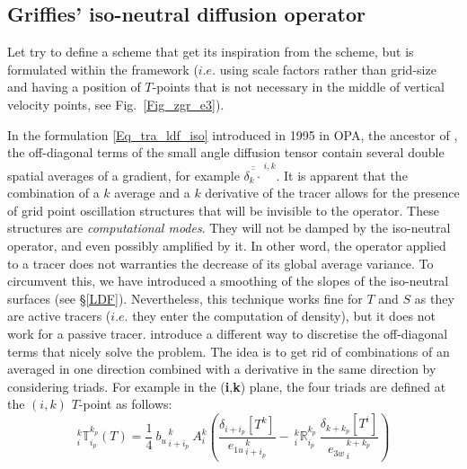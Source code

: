 \documentclass[NEMO_book]{subfiles}
\begin{document}
\subsection{Griffies' iso-neutral diffusion operator}

Let try to define a scheme that get its inspiration from the \citet{Griffies_al_JPO98}
scheme, but is formulated within the \NEMO framework ($i.e.$ using scale 
factors rather than grid-size and having a position of $T$-points that is not 
necessary in the middle of vertical velocity points, see Fig.~\ref{Fig_zgr_e3}).

In the formulation \eqref{Eq_tra_ldf_iso} introduced in 1995 in OPA, the ancestor of \NEMO, 
the off-diagonal terms of the small angle diffusion tensor contain several double 
spatial averages of a gradient, for example $\overline{\overline{\delta_k \cdot}}^{\,i,k}$. 
It is apparent that the combination of a $k$ average and a $k$ derivative of the tracer 
allows for the presence of grid point oscillation structures that will be invisible 
to the operator. These structures are \textit{computational modes}. They
will not be damped by the iso-neutral operator, and even possibly amplified by it. 
In other word, the operator applied to a tracer does not warranties the decrease of 
its global average variance. To circumvent this, we have introduced a smoothing of 
the slopes of the iso-neutral surfaces (see \S\ref{LDF}). Nevertheless, this technique 
works fine for $T$ and $S$ as they are active tracers ($i.e.$ they enter the computation 
of density), but it does not work for a passive tracer.   \citep{Griffies_al_JPO98} introduce 
a different way to discretise the off-diagonal terms that nicely solve the problem. 
The idea is to get rid of combinations of an averaged in one direction combined 
with a derivative in the same direction by considering triads. For example in the 
(\textbf{i},\textbf{k}) plane, the four triads are defined at the $(i,k)$ $T$-point as follows:
\begin{equation} \label{Gf_triads}
_i^k \mathbb{T}_{i_p}^{k_p} (T)
= \frac{1}{4} \ {b_u}_{\,i+i_p}^{\,k}  \  A_i^k  	\left(  
                                                     \frac{ \delta_{i + i_p}[T^k] }{ {e_{1u}}_{\,i + i_p}^{\,k} } 
-\ {_i^k \mathbb{R}_{i_p}^{k_p}} \ \frac{ \delta_{k+k_p} [T^i] }{ {e_{3w}}_{\,i}^{\,k+k_p} } 
									  \right)
\end{equation}
\end{document}
